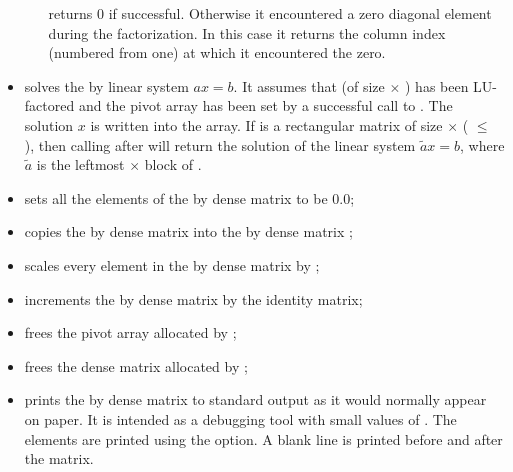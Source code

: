 \begin{itemize}
\begin{enumerate}
     returns 0 if successful. Otherwise it encountered a zero  
    diagonal element during the factorization. In this case it     
    returns the column index (numbered from one) at which it       
    encountered the zero.
    \end{enumerate}

\item {}
  \par {} solves the  by  linear system $ax = b$. 
  It assumes that  (of size  $\times$ ) has been LU-factored 
  and the pivot array  has been set by a successful call to 
  . The solution $x$ is written into the  array.
  If  is a rectangular matrix of size  $\times$  ( $\le$ ), 
  then calling  after  will return 
  the solution of the linear system $\tilde a x = b$, where $\tilde a$ is the leftmost 
   $\times$  block of .

\item {}
  \par {} sets all the elements of the  by  dense matrix
   to be $0.0$;

\item {}
  \par {} copies the  by  dense matrix  into the
   by  dense matrix ;

\item {}
  \par {} scales every element in the  by  dense
  matrix  by ;

\item {}
  \par {} increments the  by  dense matrix  by the
  identity matrix;

\item {}
  \par {} frees the pivot array  allocated by ;

\item {}
  \par {} frees the dense matrix  allocated by ;

\item {}
  \par {} prints the  by  dense matrix 
   to standard output as it would normally appear on paper. 
  It is intended as a debugging tool with small values of . 
  The elements are printed using the  option. A blank line 
  is printed before and after the matrix. 

\end{itemize}

